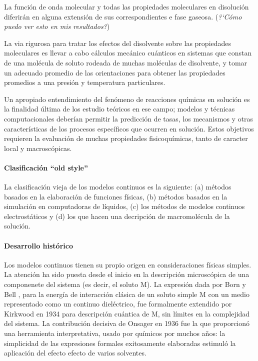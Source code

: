 La funci\'on de onda molecular y todas las propiedades moleculares en
disoluci\'on diferir\'an en alguna extensi\'on de sus 
correspondientes e fase gaseosa. ({\it ?`C\'omo puedo ver esto en mis
resultados?})

La via rigurosa para tratar los efectos del disolvente sobre las 
propiedades moleculares es llevar a cabo c\'alculos mec\'anico 
cu\'anticos en sistemas que constan de una mol\'ecula de soluto 
rodeada de muchas mol\'eculas de disolvente, y tomar un adecuado 
promedio de las orientaciones para obtener las propiedades promedios
a una presi\'on y temperatura particulares. 

Un apropiado entendimiento del fen\'omeno de reacciones qu\'imicas en 
soluci\'on es la finalidad \'ultima de los estudio te\'oricos en ese
campo; modelos y t\'ecnicas computacionales deber\'ian permitir la
predicci\'on de tasas, los mecanismos y otras caracter\'isticas de 
los procesos espec\'ificos que ocurren en soluci\'on. Estos objetivos
requieren la evaluaci\'on de muchas propiedades fisicoqu\'imicas, 
tanto de caracter local y macrosc\'opicas.

\paragraph{Clasificaci\'on ``old style''} La clasificaci\'on 
vieja de los modelos continuos es la siguiente: (a) m\'etodos basados
en la elaboraci\'on de funciones f\'isicas, (b) m\'etodos basados en 
la simulaci\'on en computadoras de l\'iquidos, (c) los m\'etodos de
modelos continuos electrost\'aticos y (d) los que hacen una 
decripci\'on de macromol\'ecula de la soluci\'on. 

\paragraph{Desarrollo hist\'orico} Los modelos continuos tienen su 
propio origen en consideraciones f\'isicas simples. La atenci\'on ha
sido puesta  desde el inicio en la descripci\'on microsc\'opica de 
una componenete del sistema (es decir, el soluto M). La expresi\'on
dada por Born \citep{Born19} y Bell \citep{Bell20}, para la energ\'ia
de interacci\'on cl\'asica de un soluto simple M con un medio 
representado como un continuo diel\'ectrico, fue formalmente 
extendido por Kirkwood \citep{Kirk21} en 1934 para descripci\'on
cu\'antica de M, sin l\'imites en la complejidad del sistema. La
contribuci\'on decisiva de Onsager \citep{Onsa22} en 1936 fue la que
proporcion\'o una herramienta interpretativa, usado por 
qu\'imicos por muchos a\~nos: la simplicidad de las expresiones 
formales exitosamente elaboradas estimul\'o la aplicaci\'on del 
efecto efecto de varios solventes.

